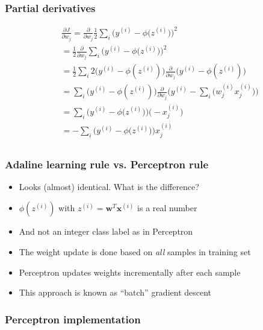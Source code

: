 \documentclass{beamer}
\begin{document}
\begin{frame}
  \frametitle{Partial derivatives}
  \begin{equation*}
    \begin{split}
      & \frac{\partial J}{\partial w_j} = \frac{\partial}{\partial w_j} \frac{1}{2} \sum_i \bigg(  y^{(i)} - \phi \big( z^{(i)} \big)  \bigg)^2 \\
      & = \frac{1}{2} \frac{\partial}{\partial w_j} \sum_i \bigg(  y^{(i)} - \phi \big( z^{(i)} \big)  \bigg)^2 \\
      & = \frac{1}{2} \sum_i 2 \big( y^{(i)} - \phi(z^{(i)})\big)  \frac{\partial}{\partial w_j} \Big( y^{(i)}  - \phi({z^{(i)}}) \Big) \\
      & = \sum_i \big( y^{(i)}  - \phi (z^{(i)})   \big) \frac{\partial}{\partial w_j} \Big( y^{(i)} - \sum_i \big(w^{(i)}_{j} x^{(i)}_{j} \big) \Big) \\
      & = \sum_i \bigg(  y^{(i)} - \phi \big( z^{(i)} \big)  \bigg) \bigg( - x_{j}^{(i)} \bigg) \\
      & = - \sum_i \bigg(  y^{(i)} - \phi \big( z^{(i)} \big)  \bigg) x_{j}^{(i)}  \\
    \end{split}
  \end{equation*}
\end{frame}

\begin{frame}
  \frametitle{Adaline learning rule vs. Perceptron rule}
  \begin{itemize}
  \item Looks (almost) identical. What is the difference?
  \item $\phi(z^{(i)})$ with $z^{(i)} = \mathbf{w}^T \mathbf{x}^{(i)}$ is a real number
  \item And not an integer class label as in Perceptron
  \item The weight update is done based on \emph{all} samples in training set
  \item Perceptron updates weights incrementally after each sample
    \item This approach is known as ``batch'' gradient descent
  \end{itemize}
\end{frame}

\begin{frame}
  \frametitle{Perceptron implementation}
  \href{https://github.com/rasbt/python-machine-learning-book/blob/master/code/ch02/ch02.ipynb}{}
\end{frame}
\end{document}
